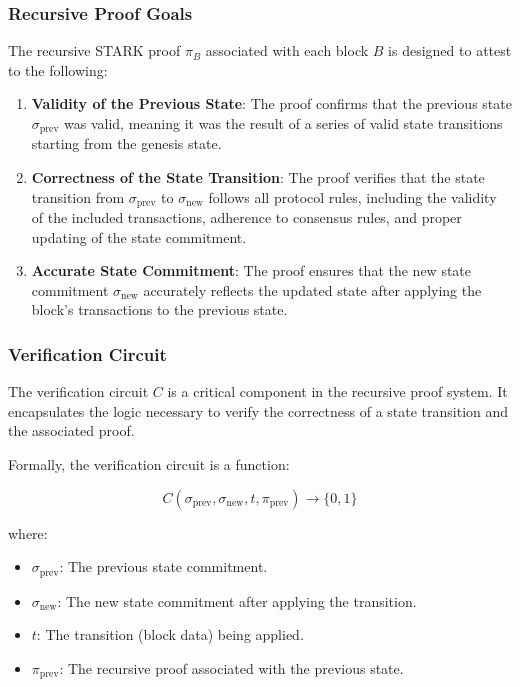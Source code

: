 \documentclass{article}
\theoremstyle{plain}
\theoremstyle{definition}
\theoremstyle{remark}
\theoremstyle{problem}
\begin{document}
\subsubsection{Recursive Proof Goals}

The recursive STARK proof $\pi_B$ associated with each block $B$ is designed to attest to the following:

\begin{enumerate}
    \item \textbf{Validity of the Previous State}: The proof confirms that the previous state $\sigma_{\text{prev}}$ was valid, meaning it was the result of a series of valid state transitions starting from the genesis state.

    \item \textbf{Correctness of the State Transition}: The proof verifies that the state transition from $\sigma_{\text{prev}}$ to $\sigma_{\text{new}}$ follows all protocol rules, including the validity of the included transactions, adherence to consensus rules, and proper updating of the state commitment.

    \item \textbf{Accurate State Commitment}: The proof ensures that the new state commitment $\sigma_{\text{new}}$ accurately reflects the updated state after applying the block's transactions to the previous state.
\end{enumerate}
\subsubsection{Verification Circuit}

The verification circuit $C$ is a critical component in the recursive proof system. It encapsulates the logic necessary to verify the correctness of a state transition and the associated proof.

Formally, the verification circuit is a function:

\[
C(\sigma_{\text{prev}}, \sigma_{\text{new}}, t, \pi_{\text{prev}}) \to \{0,1\}
\]

where:

\begin{itemize}
    \item $\sigma_{\text{prev}}$: The previous state commitment.

    \item $\sigma_{\text{new}}$: The new state commitment after applying the transition.

    \item $t$: The transition (block data) being applied.

    \item $\pi_{\text{prev}}$: The recursive proof associated with the previous state.
\end{itemize}
\end{document}
